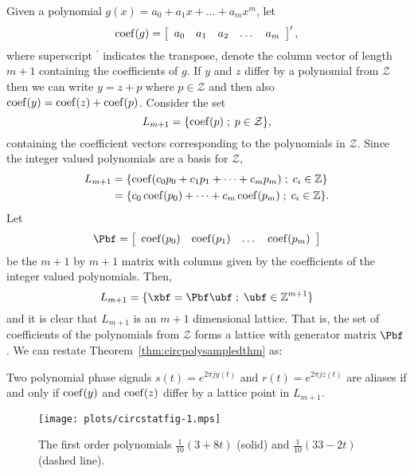 \documentclass[journal]{IEEEtran}
\begin{document}
Given a polynomial $g(x) = a_0 + a_1x + \dots + a_m x^m$, let
\[
\operatorname{coef}(g) = \left[ \begin{array}{ccccc} a_0 & a_1 & a_2 & \dots & a_m \end{array} \right]^\prime,
\]
where superscript $^\prime$ indicates the transpose, denote the column vector of length $m+1$ containing the coefficients of $g$.  If $y$ and $z$ differ by a polynomial from $\mathcal{Z}$ then we can write $y = z + p$ where $p \in \mathcal{Z}$ and then also $\operatorname{coef}(y) = \operatorname{coef}(z) + \operatorname{coef}(p)$.
  Consider the set
\[
L_{m+1} = \{ \operatorname{coef}(p) \; ; \; p \in \mathcal{Z} \},
\]
containing the coefficient vectors corresponding to the polynomials in $\mathcal{Z}$.  Since the integer valued polynomials are a basis for $\mathcal{Z}$,
\begin{align*}
L_{m+1} &= \{ \operatorname{coef}(c_0 p_0 + c_1p_1 + \dots + c_mp_m) \; ; \; c_i \in {\mathbb Z} \} \\
&= \{ c_0 \operatorname{coef}(p_0) + \dots + c_m\operatorname{coef}(p_m) \; ; \; c_i \in {\mathbb Z} \}.
\end{align*}
Let
\[
\Pbf = \left[ \begin{array}{cccc} \coef(p_0)& \coef(p_1)& \dots& \coef(p_m)  \end{array} \right]
\]
be the $m+1$ by $m+1$ matrix with columns given by the coefficients of the integer valued polynomials.  Then,
\[
L_{m+1} = \{ \xbf = \Pbf\ubf \mid \ubf \in \ints^{m+1} \}
\]
and it is clear that $L_{m+1}$ is an $m+1$ dimensional lattice.  That is, the set of coefficients of the polynomials from $\mathcal{Z}$ forms a lattice with generator matrix $\Pbf$. We can restate Theorem~\ref{thm:circpolysampledthm} as:
\begin{corollary}\label{cor:circpolysampledcoef}
Two polynomial phase signals $s(t) = e^{2\pi j y(t)}$  and $r(t) = e^{2\pi j z(t)}$ are aliases if and only if $\operatorname{coef}(y)$ and $\operatorname{coef}(z)$ differ by a lattice point in $L_{m+1}$.
\end{corollary}


\begin{figure}[t]
	\centering
		\texttt{[image: plots/circstatfig-1.mps]}
		\caption{The first order polynomials $\tfrac{1}{10}(3 + 8t)$ (solid) and $\tfrac{1}{10}(33 - 2t)$ (dashed line).}
		\label{fig:circstatplot_line}
\end{figure}
\end{document}
